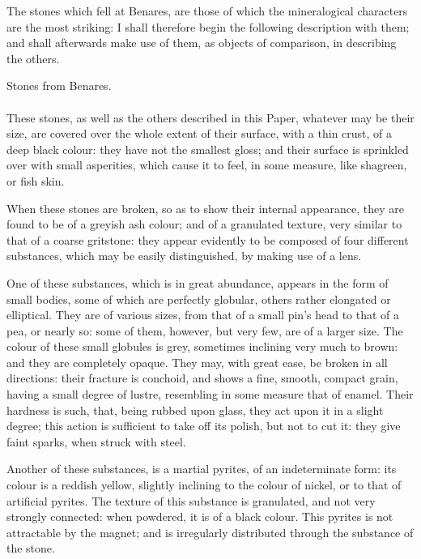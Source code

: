 \documentclass[a4paper, 12pt, oneside, twocolumn]{article}
\begin{document}
The stones which fell at Benares, are those of which the mineralogical characters are the most striking: I shall therefore begin the following description with them; and shall afterwards make use of them, as objects of comparison, in describing the others.
\begin{center}
Stones from Benares.
\end{center}
\paragraph{}
These stones, as well as the others described in this Paper, whatever may be their size, are covered over the whole extent of their surface, with a thin crust, of a deep black colour: they have not the smallest gloss; and their surface is sprinkled over with small asperities, which cause it to feel, in some measure, like shagreen, or fish skin.

When these stones are broken, so as to show their internal appearance, they are found to be of a greyish ash colour; and of a granulated texture, very similar to that of a coarse gritstone: they appear evidently to be composed of four different substances, which may be easily distinguished, by making use of a lens.

One of these substances, which is in great abundance, appears in the form of small bodies, some of which are perfectly globular, others rather elongated or elliptical. They are of various sizes, from that of a small pin's head to that of a pea, or nearly so: some of them, however, but very few, are of a larger size. The colour of these small globules is grey, sometimes inclining very much to brown: and they are completely opaque. They may, with great ease, be broken in all directions: their fracture is conchoid, and shows a fine, smooth, compact grain, having a small degree of lustre, resembling in some measure that of enamel. Their hardness is such, that, being rubbed upon glass, they act upon it in a slight degree; this action is sufficient to take off its polish, but not to cut it: they give faint sparks, when struck with steel.

Another of these substances, is a martial pyrites, of an indeterminate form: its colour is a reddish yellow, slightly inclining to the colour of nickel, or to that of artificial pyrites. The texture of this substance is granulated, and not very strongly connected: when powdered, it is of a black colour. This pyrites is not attractable by the magnet; and is irregularly distributed through the substance of the stone.
\end{document}
